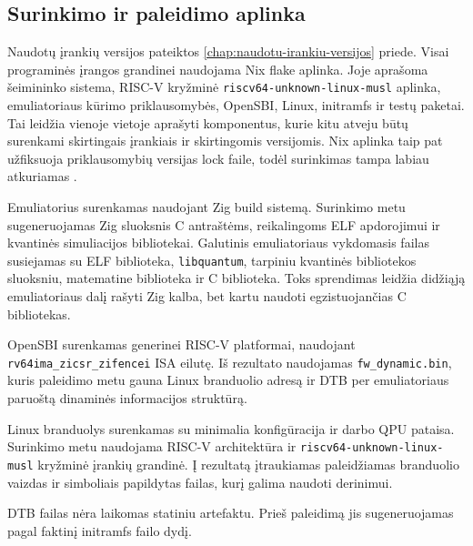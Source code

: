\subsection{Surinkimo ir paleidimo aplinka}
\label{sec:surinkimo-aplinka}

Naudotų įrankių versijos pateiktos \ref{chap:naudotu-irankiu-versijos} priede. Visai programinės įrangos grandinei naudojama Nix flake aplinka. Joje aprašoma šeimininko sistema, RISC-V kryžminė \texttt{riscv64-unknown-linux-musl} aplinka, emuliatoriaus kūrimo priklausomybės, OpenSBI, Linux, initramfs ir testų paketai. Tai leidžia vienoje vietoje aprašyti komponentus, kurie kitu atveju būtų surenkami skirtingais įrankiais ir skirtingomis versijomis. Nix aplinka taip pat užfiksuoja priklausomybių versijas lock faile, todėl surinkimas tampa labiau atkuriamas \cite{nix-dev}.

Emuliatorius surenkamas naudojant Zig build sistemą. Surinkimo metu sugeneruojamas Zig sluoksnis C antraštėms, reikalingoms ELF apdorojimui ir kvantinės simuliacijos bibliotekai. Galutinis emuliatoriaus vykdomasis failas susiejamas su ELF biblioteka, \texttt{libquantum}, tarpiniu kvantinės bibliotekos sluoksniu, matematine biblioteka ir C biblioteka. Toks sprendimas leidžia didžiąją emuliatoriaus dalį rašyti Zig kalba, bet kartu naudoti egzistuojančias C bibliotekas.

OpenSBI surenkamas generinei RISC-V platformai, naudojant \texttt{rv64ima\_zicsr\_zifencei} ISA eilutę. Iš rezultato naudojamas \texttt{fw\_dynamic.bin}, kuris paleidimo metu gauna Linux branduolio adresą ir DTB per emuliatoriaus paruoštą dinaminės informacijos struktūrą.

Linux branduolys surenkamas su minimalia konfigūracija ir darbo QPU pataisa. Surinkimo metu naudojama RISC-V architektūra ir \texttt{riscv64-unknown-linux-musl} kryžminė įrankių grandinė. Į rezultatą įtraukiamas paleidžiamas branduolio vaizdas ir simboliais papildytas failas, kurį galima naudoti derinimui.

DTB failas nėra laikomas statiniu artefaktu. Prieš paleidimą jis sugeneruojamas pagal faktinį initramfs failo dydį.

